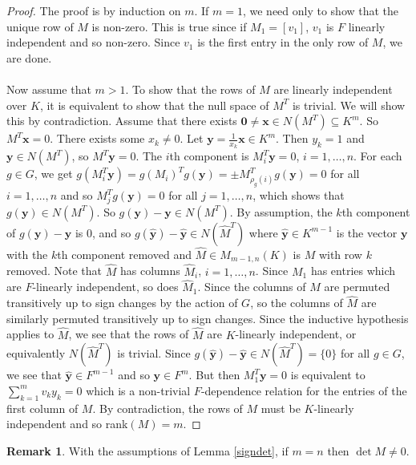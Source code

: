 \documentclass{article}
\theoremstyle{plain}
\theoremstyle{definition}
\newtheorem*{remark}{Remark}
\begin{document}
\begin{proof}
The proof is by induction on $m$. If $m = 1$, we need only to show that the unique row of $M$ is non-zero. This is true since if $M_1 = [v_1]$, $v_1$ is $F$ linearly independent and so non-zero. Since $v_1$ is the first entry in the only row of $M$, we are done.\\
\\
Now assume that $m >1$. To show that the rows of $M$ are linearly independent over $K$, it is equivalent to show that the null space of $M^T$ is trivial. We will show this by contradiction. Assume that there exists $\textbf{0} \neq \textbf{x} \in N(M^T) \subseteq K^m$. So $M^T\textbf{x} = 0$. There exists some $x_k \neq 0$. Let $\textbf{y}= \frac{1}{x_k}\textbf{x} \in K^m$. Then $y_k = 1$ and $\textbf{y}\in N(M^T)$, so $M^T \textbf{y}=0$. The $i$th component is $M^T_i \textbf{y}= 0 $, $i = 1, \ldots, n$. For each $g \in G$, we get $g(M^T_i \textbf{y}) = g(M_i)^Tg(\textbf{y}) = \pm M^T_{\rho_g(i)}g(\textbf{y}) = 0$ for all $i = 1, \ldots , n$ and so $M^T_jg(\textbf{y}) = 0$ for all $j = 1, \ldots , n$, which shows that $g(\textbf{y}) \in N(M^T)$. So $g(\textbf{y}) -\textbf{y} \in N(M^T)$. By assumption, the $k$th component of $g(\textbf{y}) - \textbf{y} $ is $0$, and so $g(\hat{\textbf{y}}) - \hat{\textbf{y}}\in N(\hat{M}^T)$ where $\hat{\textbf{y}} \in K^{m-1}$ is the vector $\textbf{y}$ with the $k$th component removed and $\hat{M} \in M_{m-1,n}(K)$ is $M$ with row $k$ removed. Note that $\hat{M}$ has columns $\hat{M}_i$, $i = 1, \ldots, n$. Since $M_1$ has entries which are $F$-linearly independent, so does $\hat{M}_1$. Since the columns of $M$ are permuted transitively up to sign changes by the action of $G$, so the columns of $\hat{M}$ are similarly permuted transitively up to sign changes. Since the inductive hypothesis applies to $\hat{M}$, we see that the rows of $\hat{M}$ are $K$-linearly independent, or equivalently $N(\hat{M}^T)$ is trivial. Since $g(\hat{\textbf{y}}) -\hat{\textbf{y}} \in N(\hat{M}^T) = \lbrace 0 \rbrace$ for all $ g \in G$, we see that $\hat{\textbf{y}}\in F^{m-1}$ and so $\textbf{y} \in F^m$. But then $M^T_1 \textbf{y} = 0 $ is equivalent to $\sum^m_{k = 1}v_ky_k = 0$ which is a non-trivial $F$-dependence relation for the entries of the first column of $M$. By contradiction, the rows of $M$ must be $K$-linearly independent and so rank$(M) = m$. 
 \end{proof} 
\begin{remark}
With the assumptions of Lemma \ref{signdet}, if $m= n$ then $\det{M}\neq 0.$
\end{remark}
\end{document}
